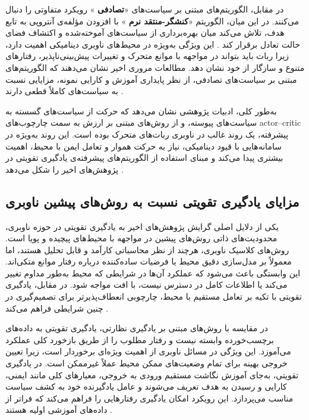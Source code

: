 در مقابل، الگوریتم‌های مبتنی بر سیاست‌های «\textbf{تصادفی}%
» رویکرد متفاوتی را دنبال می‌کنند. در این میان، الگوریتم «\textbf{کنشگر-منتقد نرم}%
» با افزودن مؤلفه‌ی آنتروپی به تابع هدف، تلاش می‌کند میان بهره‌برداری از سیاست‌های آموخته‌شده و اکتشاف فضای حالت تعادل برقرار کند
\cite{Haarnoja2018SAC}. %
 این ویژگی به‌ویژه در محیط‌های ناوبری دینامیکی اهمیت دارد، زیرا ربات باید بتواند در مواجهه با موانع متحرک و تغییرات پیش‌بینی‌ناپذیر، رفتارهای متنوع و سازگار از خود نشان دهد. مطالعات مروری اخیر نشان می‌دهند که الگوریتم‌های مبتنی بر سیاست‌های تصادفی، از نظر پایداری آموزش و کارایی نمونه، مزایایی نسبت به سیاست‌های کاملاً قطعی دارند%
\cite{Le2024DRLNavigationSurvey,Alsolami2025AutonomousNavigationSurvey}.

به‌طور کلی، ادبیات پژوهشی نشان می‌دهد که حرکت از سیاست‌های گسسته به سیاست‌های پیوسته، و از روش‌های مبتنی بر ارزش به سمت چارچوب‌های actor--critic پیشرفته، یک روند غالب در ناوبری ربات‌های متحرک بوده است. این روند به‌ویژه در سامانه‌هایی با قیود دینامیکی، نیاز به حرکت هموار و تعامل ایمن با محیط، اهمیت بیشتری پیدا می‌کند و مبنای استفاده از الگوریتم‌های پیشرفته‌ی یادگیری تقویتی در پژوهش‌های اخیر را شکل می‌دهد%
\cite{Alsolami2025AutonomousNavigationSurvey}.

\subsection{مزایای یادگیری تقویتی نسبت به روش‌های پیشین ناوبری}

یکی از دلایل اصلی گرایش پژوهش‌های اخیر به یادگیری تقویتی در حوزه ناوبری، محدودیت‌های ذاتی روش‌های پیشین در مواجهه با محیط‌های پیچیده و پویا است. روش‌های کلاسیک ناوبری، هرچند از نظر محاسباتی کارآمد و قابل تحلیل هستند، اما معمولاً بر مدل‌سازی دقیق محیط یا فرضیات ساده‌کننده درباره رفتار موانع متکی‌اند. این وابستگی باعث می‌شود که عملکرد آن‌ها در شرایطی که محیط به‌طور مداوم تغییر می‌کند یا اطلاعات کامل در دسترس نیست، با افت مواجه شود. در مقابل، یادگیری تقویتی با تکیه بر تعامل مستقیم با محیط، چارچوبی انعطاف‌پذیرتر برای تصمیم‌گیری در چنین شرایطی فراهم می‌کند%
\cite{Wang2020G2RL}.

در مقایسه با روش‌های مبتنی بر یادگیری نظارتی، یادگیری تقویتی به داده‌های برچسب‌خورده وابسته نیست و رفتار مطلوب را از طریق بازخورد کلی عملکرد می‌آموزد. این ویژگی در مسائل ناوبری از اهمیت ویژه‌ای برخوردار است، زیرا تعیین خروجی بهینه برای تمام وضعیت‌های ممکن محیط عملاً غیرممکن است. در یادگیری تقویتی، به‌جای آموزش نگاشت مستقیم ورودی به خروجی، معیارهای کلی مانند ایمنی، کارایی و رسیدن به هدف تعریف می‌شوند و عامل یادگیرنده خود به کشف سیاست مناسب می‌پردازد. این رویکرد امکان یادگیری رفتارهایی را فراهم می‌کند که فراتر از داده‌های آموزشی اولیه هستند%
\cite{Zhu2021}.


